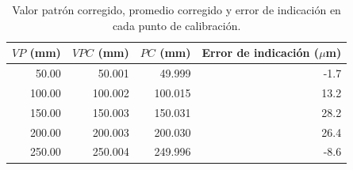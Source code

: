 \begin{table}[H]
\centering
\caption{Valor patrón corregido, promedio corregido y error de indicación en cada punto de calibración.}
\label{tab:pie-rey-vpc}
\begin{tabular}{rrrr}
\toprule
$VP$ (mm) & $VPC$ (mm) & $PC$ (mm) & Error de indicación ($\mu$m) \\
\midrule
50.00 & 50.001 & 49.999 & -1.7 \\
100.00 & 100.002 & 100.015 & 13.2 \\
150.00 & 150.003 & 150.031 & 28.2 \\
200.00 & 200.003 & 200.030 & 26.4 \\
250.00 & 250.004 & 249.996 & -8.6 \\
\bottomrule
\end{tabular}
\end{table}
